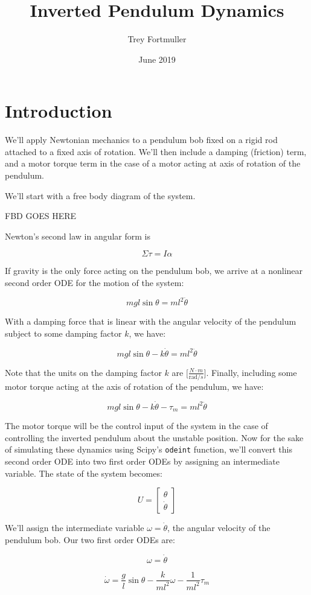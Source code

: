 \documentclass{article}
\title{Inverted Pendulum Dynamics}
\author{Trey Fortmuller}
\date{June 2019}
\begin{document}
\maketitle

\section*{Introduction}

We'll apply Newtonian mechanics to a pendulum bob fixed on a rigid rod attached to a fixed axis of rotation. We'll then include a damping (friction) term, and a motor torque term in the case of a motor acting at axis of rotation of the pendulum.

We'll start with a free body diagram of the system.

FBD GOES HERE

Newton's second law in angular form is

$$
\Sigma \tau = I \alpha
$$

If gravity is the only force acting on the pendulum bob, we arrive at a nonlinear second order ODE for the motion of the system:

$$
mgl\sin{\theta} = ml^2\ddot{\theta}
$$

With a damping force that is linear with the angular velocity of the pendulum subject to some damping factor $k$, we have:

$$
mgl\sin{\theta} - k\dot{\theta} = ml^2\ddot{\theta}
$$

Note that the units on the damping factor $k$ are $\bigg[\frac{N\cdot m}{\text{rad}/s} \bigg]$. Finally, including some motor torque acting at the axis of rotation of the pendulum, we have:

$$
mgl\sin{\theta} - k\dot{\theta} - \tau_m = ml^2\ddot{\theta}
$$

The motor torque will be the control input of the system in the case of controlling the inverted pendulum about the unstable  position. Now for the sake of simulating these dynamics using Scipy's \texttt{odeint} function, we'll convert this second order ODE into two first order ODEs by assigning an intermediate variable. The state of the system becomes:

$$
U = \begin{bmatrix}
           \theta \\
           \dot{\theta}
    \end{bmatrix}
$$

We'll assign the intermediate variable $\omega = \dot{\theta}$, the angular velocity of the pendulum bob. Our two first order ODEs are:

\begin{equation}
    \omega = \dot{\theta}
\end{equation}

\begin{equation}
    \dot{\omega} = \frac{g}{l}\sin{\theta} - \frac{k}{ml^2}\omega - \frac{1}{ml^2}\tau_m
\end{equation}
\end{document}
